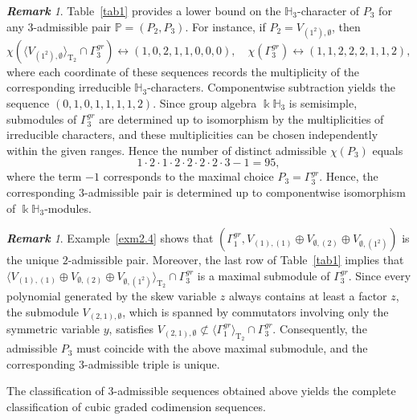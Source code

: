 \documentclass{amsart}
\theoremstyle{definition}
\theoremstyle{remark}
\newtheorem{rmk}[thm]{\bf Remark}
\numberwithin{equation}{section}
\newcommand{\lr}[1]{\langle #1 \rangle}
\def \Ga{\Gamma}
\def \k{\Bbbk}
\def \H{\mathbb{H}}
\def \P{\mathbb{P}}
\def \T{\operatorname{T}}
\def \es{\emptyset}
\begin{document}
\begin{rmk}\label{rmk2.8}
	 Table~\ref{tab1} provides a lower bound on the $\H_3$-character of $P_3$ for any $3$-admissible pair $\P = (P_2, P_3)$. For instance, if $P_2 = V_{(1^2),\es}$, then
	\[
	\chi( \lr{V_{(1^2), \es}}_{\T_2} \cap \Ga_3^{gr} ) \leftrightarrow (1, 0, 2, 1, 1, 0, 0, 0), \quad \chi(\Ga_3^{gr}) \leftrightarrow (1, 1, 2, 2, 2, 1, 1, 2),
	\]
	where each coordinate of these sequences records the multiplicity of the corresponding irreducible $\H_3$-characters. Componentwise subtraction yields the sequence $(0, 1, 0, 1, 1, 1, 1, 2)$. Since group algebra $\k\H_3$ is semisimple, submodules of $\Ga_3^{gr}$ are determined up to isomorphism by the multiplicities of irreducible characters, and these multiplicities can be chosen independently within the given ranges. Hence the number of distinct admissible $\chi(P_3)$ equals
	\[
	1 \cdot 2 \cdot 1 \cdot 2 \cdot 2 \cdot 2 \cdot 2 \cdot 3 - 1 = 95,
	\]
	where the term $-1$ corresponds to the maximal choice $P_3 = \Ga_3^{gr}$. Hence, the corresponding $3$-admissible pair is determined up to componentwise isomorphism of $\k\H_3$-modules.
\end{rmk}

\begin{rmk}\label{rmk2.9}
	Example~\ref{exm2.4} shows that $(\Ga_1^{gr}, V_{(1),(1)} \oplus V_{\es,(2)} \oplus V_{\es,(1^2)})$ is the unique $2$-admissible pair. Moreover, the last row of Table~\ref{tab1} implies that $\lr{V_{(1),(1)} \oplus V_{\es,(2)} \oplus V_{\es,(1^2)}}_{\T_2} \cap \Ga_3^{gr}$ is a maximal submodule of $\Ga_3^{gr}$. Since every polynomial generated by the skew variable $z$ always contains at least a factor $z$, the submodule $V_{(2,1),\es}$, which is spanned by commutators involving only the symmetric variable $y$, satisfies  $V_{(2,1),\es} \not\subset \lr{\Ga_1^{gr}}_{\T_2} \cap \Ga_3^{gr}$. Consequently, the admissible $P_3$ must coincide with the above maximal submodule, and the corresponding $3$-admissible triple is unique. 
\end{rmk}

	The classification of $3$-admissible sequences obtained above yields the complete classification of cubic graded codimension sequences.
\end{document}

